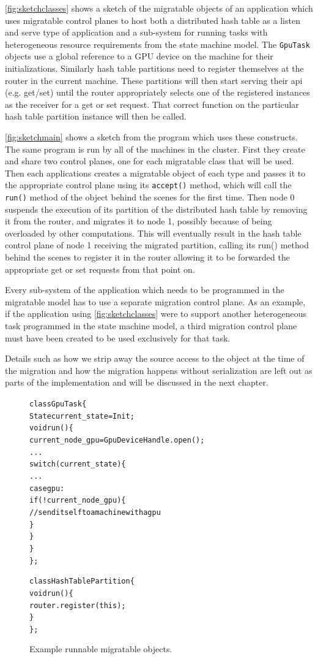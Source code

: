 \autoref{fig:sketchclasses} shows a sketch of the migratable objects of
an application which uses migratable control planes to
host both a distributed hash table as a listen and serve type of
application and a sub-system for running tasks with heterogeneous resource
requirements from the state machine model. The \texttt{GpuTask} objects
use a global reference to a GPU device on the machine for their
initializations. Similarly hash table partitions need to register
themselves at the router in the current machine. These partitions will
then start serving their api (e.g. get/set) until the router appropriately
selects one of the registered instances as the receiver for a get or set
request. That correct function on the particular hash table partition
instance will then be called.


\autoref{fig:sketchmain} shows
a sketch from the program which uses these constructs. The same program
is run by all of the machines in the cluster. First they create and share
two control planes, one for each migratable class that will be used.
Then each applications creates a migratable object of each type and passes
it to the appropriate control plane using its \texttt{accept()} method,
which will call the \texttt{run()} method of the object behind the scenes
for the first time. Then node 0 suspends the execution of its partition
    of the distributed hash table by removing it from the router,
    and migrates it to node 1, possibly because of being overloaded by
    other computations. This will eventually result in the hash table
    control plane of node 1 receiving the migrated partition, calling its
    run() method behind the scenes to register it in the router allowing
    it to be forwarded the appropriate get or set requests from that
    point on.

Every sub-system of the application which needs to be programmed in the
migratable model has to use a separate migration control plane. As an
example, if the application using \autoref{fig:sketchclasses} were to
support
another heterogeneous task programmed in the state machine model, a third
migration control plane must have been created to be used exclusively for
that task.

Details such as how we strip away the source access to the object at the
time of the migration and how the migration happens without serialization
are left out as parts of the implementation and will be discussed in the
next chapter.


\begin{figure}[t]
\begin{alltt}

class GpuTask \{
    State current_state = Init;
    void run() \{
        current_node_gpu = GpuDeviceHandle.open();
        ...
        switch(current_state) \{
            ...
            case gpu:
              if(!current_node_gpu) \{
                // send itself to a machine with a gpu
              \}
        \}
    \}
\};

class HashTablePartition \{
    void run() \{
        router.register(this);
    \}
\};
\end{alltt}
\caption{
    Example runnable migratable objects.
}
\label{fig:sketchclasses}
\end{figure}


